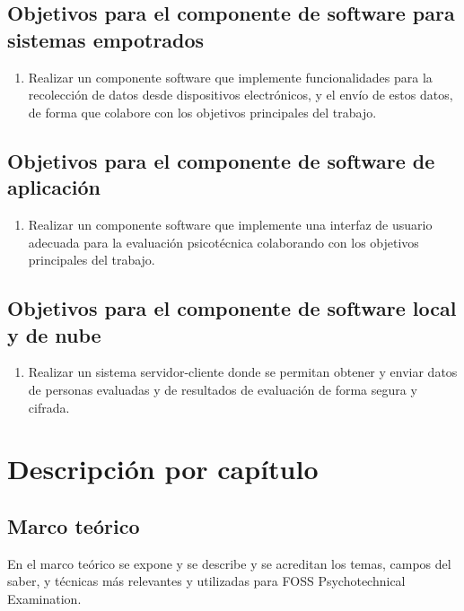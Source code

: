 \documentclass[12pt,a4paper,twoside,openright]{book}
\begin{document}
\subsection{Objetivos para el componente de software para sistemas empotrados}

\begin{enumerate}
  \item Realizar un componente software que implemente funcionalidades para la recolección de datos desde dispositivos electrónicos, y el envío de estos datos, de forma que colabore con los objetivos principales del trabajo.
\end{enumerate}

\subsection{Objetivos para el componente de software de aplicación}

\begin{enumerate}
  \item Realizar un componente software que implemente una interfaz de usuario adecuada para la evaluación psicotécnica colaborando con los objetivos principales del trabajo. 
\end{enumerate}

\subsection{Objetivos para el componente de software local y de nube}

\begin{enumerate}
  \item Realizar un sistema servidor-cliente donde se permitan obtener y enviar datos de personas evaluadas y de resultados de evaluación de forma segura y cifrada.
\end{enumerate}

\section{Descripción por capítulo}

\subsection{Marco teórico}

En el marco teórico se expone y se describe y se acreditan los temas, campos del saber, y técnicas más relevantes y utilizadas para FOSS Psychotechnical Examination.
\end{document}
